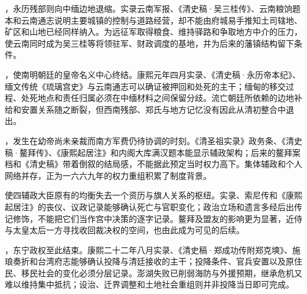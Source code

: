 \begin{event}
，永历残部则向中缅边地退缩。实录云南军报、《清史稿·吴三桂传》、云南粮饷题本和云南通志说明主要城镇的控制与道路经营，却不能由府城易手推知土司辖地、矿区和山地已经同样纳入。为远征军取得粮食、维持驿路和争取地方中介的压力，使云南同时成为吴三桂等将领驻军、财政调度的基地，并为后来的藩镇结构留下条件。
\end{event}

\begin{event}
，使南明朝廷的皇帝名义中心终结。康熙元年四月实录、《清史稿·永历帝本纪》、缅文传统《琉璃宫史》与云南通志可以确证被押回和处死的主干；缅甸的移交过程、处死地点和责任归属必须在中缅材料之间保留分歧。流亡朝廷所依赖的边地补给和安置关系随之断裂，但西南残部、郑氏与地方记忆没有因此从清初整合中退出。
\end{event}

\begin{event}
，发生在幼帝尚未亲裁而南方军费仍待协调的时刻。《清圣祖实录》政务条、《清史稿·鳌拜传》、《康熙起居注》和内阁大库满汉题本能显示辅政架构；后来的鳌拜案档和《清史稿》带着倒叙的结局感，不能据此预定当时权力高下。集体辅政和个人网络并存，正为一六六九年的权力重组积累了制度背景。
\end{event}

\begin{event}
使四辅政大臣原有的均衡失去一个资历与旗人关系的枢纽。实录、索尼传和《康熙起居注》的丧仪、议政记录能够确认死亡与官职变化；政治立场和遗言多经后出传记修饰，不能把它们当作宫中决策的逐字记录。鳌拜及盟友的影响更为显著，近侍与太皇太后一方寻找收回裁决权的空间，也由此成为可见的后续。
\end{event}

\begin{event}
，东宁政权至此结束。康熙二十二年八月实录、《清史稿·郑成功传附郑克塽》、施琅奏折和台湾府志能够确认投降与清廷接收的主干；投降条件、官兵安置以及原住民、移民社会的变化必须分层记录。澎湖失败已削弱海防与外援预期，继承危机又难以维持集中抵抗；设治、迁界调整和土地社会重组则并非投降当日即可完成。
\end{event}

